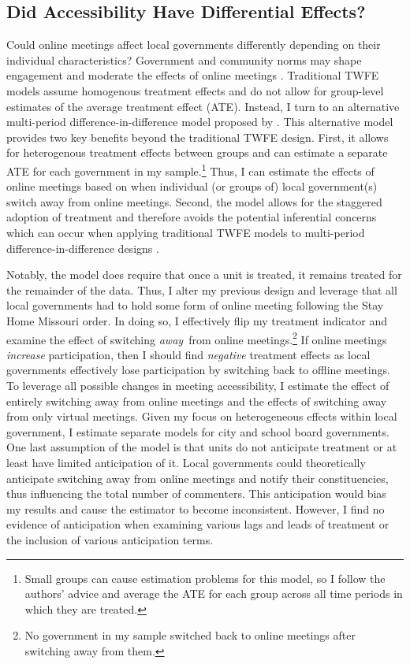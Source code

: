     \subsection{Did Accessibility Have Differential Effects?}
    Could online meetings affect local governments differently depending on their individual characteristics? Government and community norms may shape engagement and moderate the effects of online meetings \citep[e.g.,][]{choExperimentingPublicEngagement2021,nuamahCloseHomePlaceBased2021}. Traditional TWFE models assume homogenous treatment effects and do not allow for group-level estimates of the average treatment effect (ATE). Instead, I turn to an alternative multi-period difference-in-difference model proposed by \citet{callawayDifferenceinDifferencesMultipleTime2021}. This alternative model provides two key benefits beyond the traditional TWFE design. First, it allows for heterogenous treatment effects between groups and can estimate a separate ATE for each government in my sample.\footnote{Small groups can cause estimation problems for this model, so I follow the authors' advice and average the ATE for each group across all time periods in which they are treated.} Thus, I can estimate the effects of online meetings based on when individual (or groups of) local government(s) switch away from online meetings. Second, the model allows for the staggered adoption of treatment and therefore avoids the potential inferential concerns which can occur when applying traditional TWFE models to multi-period difference-in-difference designs \citep{imaiUseTwoWayFixed2021,sunEstimatingDynamicTreatment2021}.

    Notably, the model does require that once a unit is treated, it remains treated for the remainder of the data. Thus, I alter my previous design and leverage that all local governments had to hold some form of online meeting following the Stay Home Missouri order. In doing so, I effectively flip my treatment indicator and examine the effect of switching \emph{away} from online meetings.\footnote{No government in my sample switched back to online meetings after switching away from them.} If online meetings \emph{increase} participation, then I should find \emph{negative} treatment effects as local governments effectively lose participation by switching back to offline meetings. To leverage all possible changes in meeting accessibility, I estimate the effect of entirely switching away from online meetings and the effects of switching away from only virtual meetings. Given my focus on heterogeneous effects within local government, I estimate separate models for city and school board governments. One last assumption of the model is that units do not anticipate treatment or at least have limited anticipation of it. Local governments could theoretically anticipate switching away from online meetings and notify their constituencies, thus influencing the total number of commenters. This anticipation would bias my results and cause the estimator to become inconsistent. However, I find no evidence of anticipation when examining various lags and leads of treatment or the inclusion of various anticipation terms.

